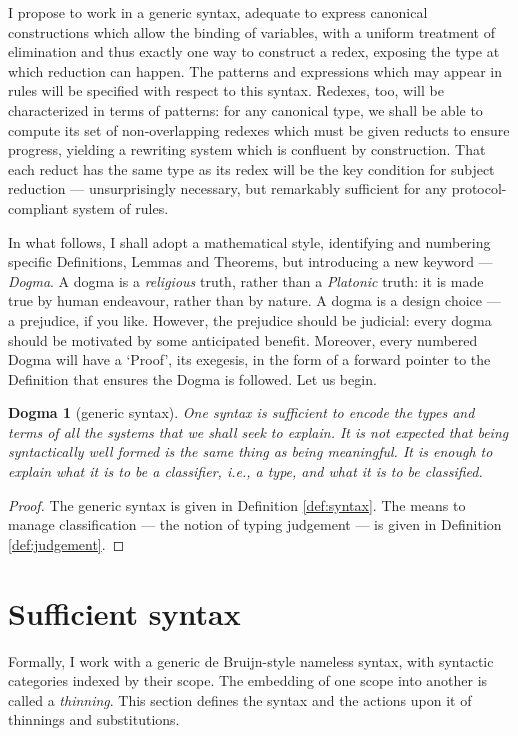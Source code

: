 \documentclass{jfp1}
\newtheorem{dogma}[theorem]{Dogma}
\newcommand{\bsl}{\texttt{\symbol{92}}}
\begin{document}
I propose to work in a generic syntax, adequate to express canonical
constructions which allow the binding of variables, with a uniform
treatment of elimination and thus exactly one way to construct a
redex, exposing the type at which reduction can happen. The patterns
and expressions which may appear in rules will be specified with
respect to this syntax. Redexes, too, will be characterized in terms
of patterns: for any canonical type, we shall be able to compute its
set of non-overlapping redexes which must be given reducts to ensure
progress, yielding a rewriting system which is confluent by
construction. That each reduct has the same type as its redex
will be the key condition for subject reduction --- unsurprisingly
necessary, but remarkably sufficient for any protocol-compliant
system of rules.

In what follows, I shall adopt a mathematical style, identifying and
numbering specific Definitions, Lemmas and Theorems, but introducing a
new keyword --- \emph{Dogma}. A dogma is a \emph{religious} truth,
rather than a \emph{Platonic} truth: it is made true by human
endeavour, rather than by nature. A dogma is a design choice --- a
prejudice, if you like. However, the prejudice should be judicial:
every dogma should be motivated by some anticipated benefit. Moreover,
every numbered Dogma will have a `Proof', its exegesis, in the form of a
forward pointer to the Definition that ensures the Dogma is
followed. Let us begin.

\begin{dogma}[generic syntax]
  One syntax is sufficient to encode the types and terms of all the
  systems that we shall seek to explain. It is not expected that
  being syntactically well formed is the same thing as being
  meaningful. It is enough to explain what it is to be a classifier,
  i.e., a \emph{type}, and what it is to be classified.
\end{dogma}
\begin{proof}
  The generic syntax is given in Definition \ref{def:syntax}. The
  means to manage classification --- the notion of typing judgement ---
  is given in Definition \ref{def:judgement}.
\end{proof}


\section{Sufficient syntax}

\newcommand{\la}[1]{\bsl #1\:}

Formally, I work with a generic de Bruijn-style nameless syntax, with syntactic
categories indexed by their scope. The embedding of one scope into another
is called a \emph{thinning}. This section defines the syntax and the actions
upon it of thinnings and substitutions.
\end{document}
